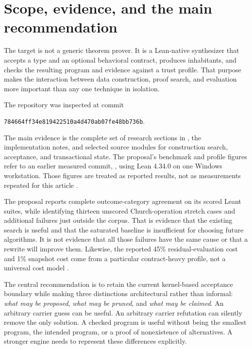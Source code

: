 \section{Scope, evidence, and the main recommendation}\label{sec:scope}

The target is not a generic theorem prover. It is a Lean-native synthesizer
that accepts a type and an optional behavioral contract, produces inhabitants,
and checks the resulting program and evidence against a trust profile.
That purpose makes the interaction between data construction, proof search,
and evaluation more important than any one technique in isolation.

The repository was inspected at commit
\begin{center}\small\texttt{784664ff34e819422510a4d470ab07fe48bb736b}.\end{center}
The main evidence is the complete set of research sections in
, the implementation notes, and
selected source modules for construction search, acceptance, and transactional
state. The proposal's benchmark and profile figures
refer to an earlier measured commit, , using Lean 4.34.0 on one
Windows workstation. Those figures are treated as reported results, not as
measurements repeated for this article \cite{repo,proposal,implementation}.

The proposal reports complete outcome-category agreement on its scored Leant
suites, while identifying thirteen unscored Church-operation stretch cases
and additional failures just outside the corpus. That is evidence that the
existing search is useful and that the saturated baseline is insufficient
for choosing future algorithms. It is not evidence that all those failures
have the same cause or that a rewrite will improve them. Likewise, the reported
45\% residual-evaluation cost and 1\% snapshot cost come from a particular
contract-heavy profile, not a universal cost model \cite{proposal}.

The central recommendation is to retain the current kernel-based acceptance
boundary while making three distinctions architectural rather than informal:
\emph{what may be proposed}, \emph{what may be pruned}, and \emph{what may be
claimed}. An arbitrary carrier guess can be useful. An arbitrary carrier
refutation can silently remove the only solution. A checked program is useful
without being the smallest program, the intended program, or a proof of
nonexistence of alternatives. A stronger engine needs to represent these
differences explicitly.

